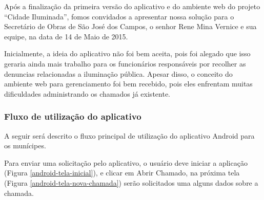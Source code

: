 \documentclass[
	article,			%
	11pt,				%
	oneside,			%
	a4paper,			%
	english,			%
	brazil,				%
	sumario=tradicional
	]{abntex2}
\begin{document}
Após a finalização da primeira versão do aplicativo e do ambiente web do projeto “Cidade Iluminada”, fomos convidados a apresentar nossa solução para o Secretário de Obras de São José dos Campos, o senhor Rene Mina Vernice e sua equipe, na data de 14 de Maio de 2015.

Inicialmente, a ideia do aplicativo não foi bem aceita, pois foi alegado que isso geraria ainda mais trabalho para os funcionários responsáveis por recolher as denuncias relacionadas a iluminação pública.
Apesar disso, o conceito do ambiente web para gerenciamento foi bem recebido, pois eles enfrentam muitas dificuldades administrando os chamados já existente.

\subsubsection{Fluxo de utilização do aplicativo}

A seguir será descrito o fluxo principal de utilização do aplicativo Android para os munícipes.

Para enviar uma solicitação pelo aplicativo, o usuário deve iniciar a aplicação (Figura \ref{android-tela-inicial}), e clicar em Abrir Chamado, na próxima tela (Figura \ref{android-tela-nova-chamada}) serão solicitados uma alguns dados sobre a chamada.
\end{document}
